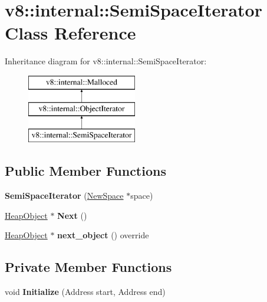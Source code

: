 \hypertarget{classv8_1_1internal_1_1_semi_space_iterator}{}\section{v8\+:\+:internal\+:\+:Semi\+Space\+Iterator Class Reference}
\label{classv8_1_1internal_1_1_semi_space_iterator}
Inheritance diagram for v8\+:\+:internal\+:\+:Semi\+Space\+Iterator\+:\begin{figure}[H]
\begin{center}
\leavevmode
\includegraphics[height=3.000000cm]{classv8_1_1internal_1_1_semi_space_iterator}
\end{center}
\end{figure}
\subsection*{Public Member Functions}
\begin{DoxyCompactItemize}
\item 
{\bfseries Semi\+Space\+Iterator} (\hyperlink{classv8_1_1internal_1_1_new_space}{New\+Space} $\ast$space)\hypertarget{classv8_1_1internal_1_1_semi_space_iterator_ac5e7b5fd619d66ab4704cb5963b68d2c}{}\label{classv8_1_1internal_1_1_semi_space_iterator_ac5e7b5fd619d66ab4704cb5963b68d2c}

\item 
\hyperlink{classv8_1_1internal_1_1_heap_object}{Heap\+Object} $\ast$ {\bfseries Next} ()\hypertarget{classv8_1_1internal_1_1_semi_space_iterator_afd815b5eb8211ee42ebc8a87a60c2fd1}{}\label{classv8_1_1internal_1_1_semi_space_iterator_afd815b5eb8211ee42ebc8a87a60c2fd1}

\item 
\hyperlink{classv8_1_1internal_1_1_heap_object}{Heap\+Object} $\ast$ {\bfseries next\+\_\+object} () override\hypertarget{classv8_1_1internal_1_1_semi_space_iterator_af75ce5473cd2730f785d5b9ec5a30526}{}\label{classv8_1_1internal_1_1_semi_space_iterator_af75ce5473cd2730f785d5b9ec5a30526}

\end{DoxyCompactItemize}
\subsection*{Private Member Functions}
\begin{DoxyCompactItemize}
\item 
void {\bfseries Initialize} (Address start, Address end)\hypertarget{classv8_1_1internal_1_1_semi_space_iterator_a12a0ed98fa6968604afe056f502fe2dc}{}\label{classv8_1_1internal_1_1_semi_space_iterator_a12a0ed98fa6968604afe056f502fe2dc}

\end{DoxyCompactItemize}
